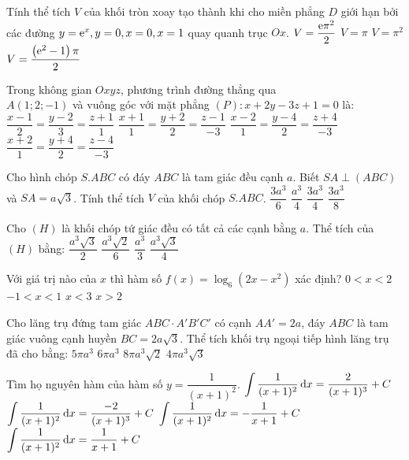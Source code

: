 \begin{ex}%
Tính thể tích $V$ của khối tròn xoay tạo thành khi cho miền phẳng $D$ giới hạn bởi các đường $y={\rm e}^{x}, y=0, x=0, x=1$ quay quanh trục $O x$.
\choice
{$V=\dfrac{{\rm e} \pi^2}{2}$}
{$V=\pi$}
{$V=\pi^2$}
{\True $V=\dfrac{\left({\rm e}^2-1\right) \pi}{2}$}

\end{ex}
\begin{ex}%
Trong không gian $O x y z$, phương trình đường thẳng qua\\ $A(1; 2;-1)$ và vuông góc với mặt phẳng $(P)\colon x+2 y-3 z+1=0$ là:
\choice
{$\dfrac{x-1}{2}=\dfrac{y-2}{3}=\dfrac{z+1}{1}$}
{$\dfrac{x+1}{1}=\dfrac{y+2}{2}=\dfrac{z-1}{-3}$}
{\True $\dfrac{x-2}{1}=\dfrac{y-4}{2}=\dfrac{z+4}{-3}$}
{$\dfrac{x+2}{1}=\dfrac{y+4}{2}=\dfrac{z-4}{-3}$}

\end{ex}
\begin{ex}%
Cho hình chóp $S.ABC$ có đáy $ABC$ là tam giác đều cạnh $a$. Biết $SA \perp(ABC)$ và $SA=a \sqrt{3}$. Tính thể tích $V$ của khối chóp $S.ABC$.
\choice
{$\dfrac{3 a^3}{6}$}
{\True $\dfrac{a^3}{4}$}
{$\dfrac{3 a^3}{4}$}
{$\dfrac{3 a^3}{8}$}

\end{ex}
\begin{ex}%
Cho $(H)$ là khối chóp tứ giác đều có tất cả các cạnh bằng $a$. Thể tích của $(H)$ bằng:
\choice
{$\dfrac{a^3 \sqrt{3}}{2}$}
{\True $\dfrac{a^3 \sqrt{2}}{6}$}
{$\dfrac{a^3}{3}$}
{$\dfrac{a^3 \sqrt{3}}{4}$}

\end{ex}
\begin{ex}%
Với giá trị nào của $x$ thì hàm số $f(x)=\log_6\left(2 x-x^2\right)$ xác định?
\choice
{\True $0<x<2$}
{$-1<x<1$}
{$x<3$}
{$x>2$}

\end{ex}
\begin{ex}%
Cho lăng trụ đứng tam giác $ABC \cdot A'B'C'$ có cạnh $AA'=2 a$, đáy $ABC$ là tam giác vuông cạnh huyền $BC=2 a \sqrt{3}$. Thể tích khối trụ ngoại tiếp hình lăng trụ đã cho bằng:
\choice
{$5\pi a^3$}
{\True $6\pi a^3$}
{$8\pi a^3 \sqrt{2}$}
{$4\pi a^3 \sqrt{3}$}

\end{ex}
\begin{ex}%
Tìm họ nguyên hàm của hàm số $y=\dfrac{1}{(x+1)^2}$.
\choice
{$\displaystyle\displaystyle\int \dfrac{1}{(x+1)^2} \mathrm{\,d} x=\dfrac{2}{(x+1)^3}+C$}
{$\displaystyle\displaystyle\int \dfrac{1}{(x+1)^2} \mathrm{\,d} x=\dfrac{-2}{(x+1)^3}+C$}
{\True $\displaystyle\displaystyle\int \dfrac{1}{(x+1)^2} \mathrm{\,d} x=-\dfrac{1}{x+1}+C$}
{$\displaystyle\displaystyle\int \dfrac{1}{(x+1)^2} \mathrm{\,d} x=\dfrac{1}{x+1}+C$}

\end{ex}
